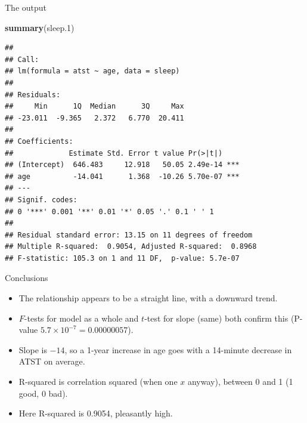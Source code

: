 \documentclass[
  ignorenonframetext,
]{beamer}
\newenvironment{Shaded}{\begin{snugshade}}{\end{snugshade}}
\newcommand{\FloatTok}[1]{\textcolor[rgb]{0.00,0.00,0.81}{#1}}
\newcommand{\KeywordTok}[1]{\textcolor[rgb]{0.13,0.29,0.53}{\textbf{#1}}}
\newcommand{\NormalTok}[1]{#1}
\begin{document}
\begin{frame}[fragile]{The output}
\protect\hypertarget{the-output}{}

\scriptsize

\begin{Shaded}
\begin{Highlighting}[]
\KeywordTok{summary}\NormalTok{(sleep}\FloatTok{.1}\NormalTok{)}
\end{Highlighting}
\end{Shaded}

\begin{verbatim}
## 
## Call:
## lm(formula = atst ~ age, data = sleep)
## 
## Residuals:
##     Min      1Q  Median      3Q     Max 
## -23.011  -9.365   2.372   6.770  20.411 
## 
## Coefficients:
##             Estimate Std. Error t value Pr(>|t|)    
## (Intercept)  646.483     12.918   50.05 2.49e-14 ***
## age          -14.041      1.368  -10.26 5.70e-07 ***
## ---
## Signif. codes:  
## 0 '***' 0.001 '**' 0.01 '*' 0.05 '.' 0.1 ' ' 1
## 
## Residual standard error: 13.15 on 11 degrees of freedom
## Multiple R-squared:  0.9054, Adjusted R-squared:  0.8968 
## F-statistic: 105.3 on 1 and 11 DF,  p-value: 5.7e-07
\end{verbatim}

\normalsize

\end{frame}

\begin{frame}{Conclusions}
\protect\hypertarget{conclusions}{}

\begin{itemize}
\item
  The relationship appears to be a straight line, with a downward trend.
\item
  \(F\)-tests for model as a whole and \(t\)-test for slope (same) both
  confirm this (P-value \(5.7\times 10^{-7}=0.00000057\)).
\item
  Slope is \(-14\), so a 1-year increase in age goes with a 14-minute
  decrease in ATST on average.
\item
  R-squared is correlation squared (when one \(x\) anyway), between 0
  and 1 (1 good, 0 bad).
\item
  Here R-squared is 0.9054, pleasantly high.
\end{itemize}

\end{frame}
\end{document}
